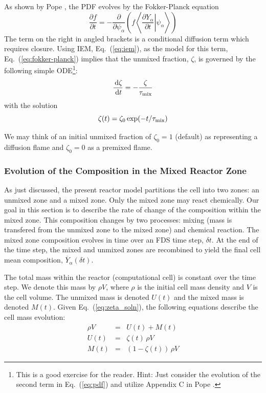 As shown by Pope \cite{Pope:2000}, the PDF evolves by the Fokker-Planck equation
\begin{equation}
\label{eq:fokker-planck}
\frac{\partial f}{\partial t} = -\frac{\partial}{\partial \psi_\alpha} \left(f \left\langle \left. \frac{\partial Y_\alpha}{\partial t} \right| \psi_\alpha \right\rangle \right)
\end{equation}
The term on the right in angled brackets is a conditional diffusion term which requires closure.  Using IEM, Eq.~(\ref{eq:iem}), as the model for this term, Eq.~(\ref{eq:fokker-planck}) implies that the unmixed fraction, $\zeta$, is governed by the following simple ODE\footnote{This is a good exercise for the reader.  Hint: Just consider the evolution of the second term in Eq.~(\ref{eq:pdf}) and utilize Appendix C in Pope \cite{Pope:2000}.}:
\begin{equation}
\label{eq:zeta}
\frac{\,\mathrm{d} \zeta}{\,\mathrm{d} t}=-\frac{\zeta}{\tau_{\rm mix}}
\end{equation}
with the solution
\begin{equation}
\label{eq:zeta_soln}
\zeta(t) = \zeta_0 \exp(-t/\tau_{\rm mix})
\end{equation}

We may think of an initial unmixed fraction of $\zeta_0=1$ (default) as representing a diffusion flame and $\zeta_0=0$ as a premixed flame.


\subsubsection{Evolution of the Composition in the Mixed Reactor Zone}

As just discussed, the present reactor model partitions the cell into two zones: an unmixed zone and a mixed zone.  Only the mixed zone may react chemically.  Our goal in this section is to describe the rate of change of the composition within the mixed zone.  This composition changes by two processes: mixing (mass is transfered from the unmixed zone to the mixed zone) and chemical reaction.  The mixed zone composition evolves in time over an FDS time step, $\delta t$.  At the end of the time step, the mixed and unmixed zones are recombined to yield the final cell mean composition, $\overline{Y}_\alpha(\delta t)$.

The total mass within the reactor (computational cell) is constant over the time step.  We denote this mass by $\rho V$, where $\rho$ is the initial cell mass density and $V$ is the cell volume.  The unmixed mass is denoted $U(t)$ and the mixed mass is denoted $M(t)$.  Given Eq.~(\ref{eq:zeta_soln}), the following equations describe the cell mass evolution:
\begin{eqnarray}
\label{eq:mixunmix_1} \rho V &=& U(t) + M(t) \\
\label{eq:mixunmix_2} U(t) &=& \zeta(t)\,\rho V \\
\label{eq:mixunmix_3} M(t) &=& (1-\zeta(t))\,\rho V
\end{eqnarray}

